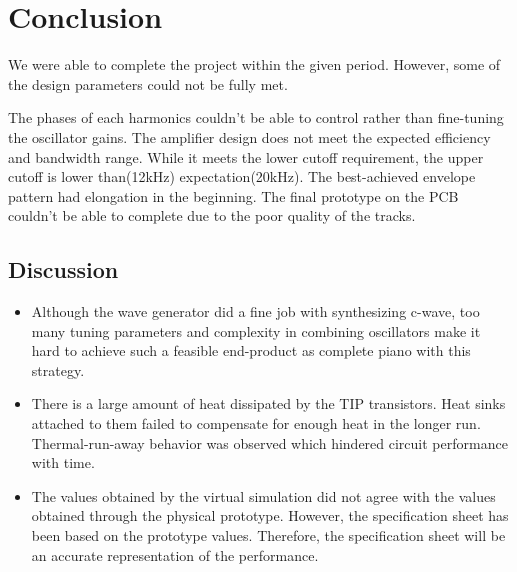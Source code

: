\section{Conclusion}
We were able to complete the project within the given period. However, some of the design parameters could not be fully met.
\par
The phases of each harmonics couldn't be able to control rather than fine-tuning the oscillator gains. The amplifier design does not meet the expected efficiency and bandwidth range. While it meets the lower cutoff requirement, the upper cutoff is lower than(12kHz) expectation(20kHz). The best-achieved envelope pattern had elongation in the beginning. The final prototype on the PCB couldn't be able to complete due to the poor quality of the tracks.
\subsection*{Discussion}
\begin{itemize}
    \item Although the wave generator did a fine job with synthesizing c-wave, too many tuning parameters and complexity in combining oscillators make it hard to achieve such a feasible end-product as complete piano with this strategy.
    \item There is a large amount of heat dissipated by the TIP transistors. Heat sinks attached to them failed to compensate for enough heat in the longer run. Thermal-run-away behavior was observed which hindered circuit performance with time.
    \item The values obtained by the virtual simulation did not agree with the values obtained through the physical prototype. However, the specification sheet has been based on the prototype values. Therefore, the specification sheet will be an accurate representation of the performance.
\end{itemize}
\onecolumn
